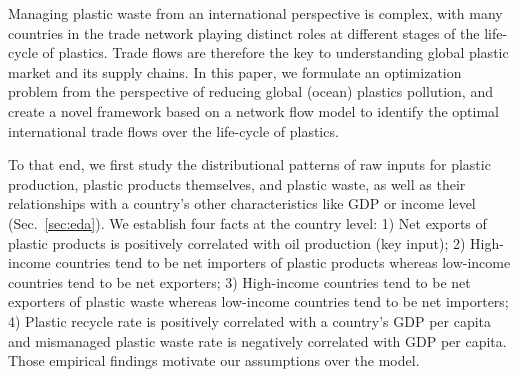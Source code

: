 \documentclass[dvipsnames]{article}
\begin{document}
Managing plastic waste from an international perspective is complex, with many countries in the trade network playing distinct roles at different stages of the life-cycle of plastics. %
Trade flows are therefore the key to understanding global plastic market and its supply chains. %
In this paper, we formulate an optimization problem from the perspective of reducing global (ocean) plastics pollution, and create a novel framework based on a network flow model to identify the optimal international trade flows over the life-cycle of plastics.

To that end, we first study the distributional patterns of raw inputs for plastic production, plastic products themselves, and plastic waste, as well as their relationships with a country's other characteristics like GDP or income level (Sec.~\ref{sec:eda}). We establish four facts at the country level: 1) Net exports of plastic products is positively correlated with oil production (key input); 2) High-income countries tend to be net importers of plastic products whereas low-income countries tend to be net exporters; 3) High-income countries tend to be net exporters of plastic waste whereas low-income countries tend to be net importers; 4) Plastic recycle rate is positively correlated with a country's GDP per capita and mismanaged plastic waste rate is negatively correlated with GDP per capita. Those empirical findings motivate our assumptions over the model. %
\end{document}
